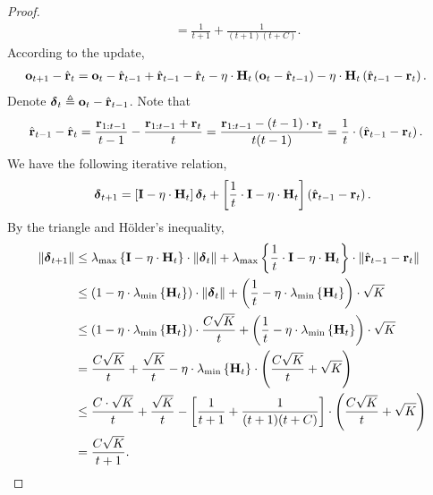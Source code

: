 \documentclass[10pt]{article}
\begin{document}
\begin{proof}
\begin{equation*}
\begin{split}
    &= \frac{1}{t+1} + \frac{1}{(t+1)(t+C)}.
\end{split}
\end{equation*}
According to the update,
\begin{equation*}
\begin{split}
    {\mathbf{o}}_{t+1} - \hat{{\mathbf{r}}}_t &= {\mathbf{o}}_{t} - \hat{{\mathbf{r}}}_{t-1} + \hat{{\mathbf{r}}}_{t-1} - \hat{{\mathbf{r}}}_t - \eta \cdot {\mathbf{H}}_t \left( {\mathbf{o}}_{t} - \hat{{\mathbf{r}}}_{t-1} \right) - \eta \cdot {\mathbf{H}}_t \left( \hat{{\mathbf{r}}}_{t-1} - {\mathbf{r}}_t \right).
\end{split}
\end{equation*}
Denote ${\boldsymbol{\delta}}_{t} \triangleq {\mathbf{o}}_{t} - \hat{{\mathbf{r}}}_{t-1}$. Note that
\begin{equation*}
\begin{split}
    \hat{{\mathbf{r}}}_{t-1} - \hat{{\mathbf{r}}}_t &= \frac{{\mathbf{r}}_{1:t-1}}{t-1} - \frac{{\mathbf{r}}_{1:t-1} + {\mathbf{r}}_t}{t} = \frac{{\mathbf{r}}_{1:t-1} - (t-1) \cdot {\mathbf{r}}_t }{t(t-1)} = \frac{1}{t} \cdot \left( \hat{{\mathbf{r}}}_{t-1} - {\mathbf{r}}_t \right).
\end{split}
\end{equation*}
We have the following iterative relation,
\begin{equation*}
\begin{split}
    {\boldsymbol{\delta}}_{t+1} = \left[ {\mathbf{I}} - \eta \cdot {\mathbf{H}}_t \right] {\boldsymbol{\delta}}_t + \left[ \frac{1}{t} \cdot {\mathbf{I}} - \eta \cdot {\mathbf{H}}_t \right] \left( \hat{{\mathbf{r}}}_{t-1} - {\mathbf{r}}_t \right).
\end{split}
\end{equation*}
By the triangle and H{\" o}lder's inequality,
\begin{equation*}
\begin{split}
    \left\| {\boldsymbol{\delta}}_{t+1} \right\| &\le \lambda_{\max}\left\{ {\mathbf{I}} - \eta \cdot {\mathbf{H}}_t \right\} \cdot \left\| {\boldsymbol{\delta}}_{t} \right\| + \lambda_{\max}\left\{ \frac{1}{t} \cdot {\mathbf{I}} - \eta \cdot {\mathbf{H}}_t \right\} \cdot \left\| \hat{{\mathbf{r}}}_{t-1} - {\mathbf{r}}_t \right\| \\
    &\le \left( 1 - \eta \cdot \lambda_{\min}\left\{ {\mathbf{H}}_t \right\} \right) \cdot \left\| {\boldsymbol{\delta}}_{t} \right\| + \left( \frac{1}{t} - \eta \cdot \lambda_{\min}\left\{ {\mathbf{H}}_t \right\} \right) \cdot \sqrt{K} \\
    &\le \left( 1 - \eta \cdot \lambda_{\min}\left\{ {\mathbf{H}}_t \right\} \right) \cdot \frac{C \sqrt{K}}{t} + \left( \frac{1}{t} - \eta \cdot \lambda_{\min}\left\{ {\mathbf{H}}_t \right\} \right) \cdot \sqrt{K} \\
    &= \frac{C \sqrt{K}}{t} + \frac{\sqrt{K}}{t} - \eta \cdot \lambda_{\min}\left\{ {\mathbf{H}}_t \right\} \cdot \left( \frac{C \sqrt{K}}{t} + \sqrt{K} \right) \\
    &\le \frac{C \cdot \sqrt{K}}{t} + \frac{\sqrt{K}}{t} - \left[ \frac{1}{t+1} + \frac{1}{(t+1)(t+C)} \right] \cdot \left( \frac{C \sqrt{K}}{t} + \sqrt{K} \right) \\
    &= \frac{C \sqrt{K}}{t+1}. \qedhere
\end{split}
\end{equation*}
\end{proof}

\begin{equation*}
\begin{split}
    
\end{split}
\end{equation*}
\fi
\end{document}

